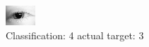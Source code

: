 \begin{figure}[h!]
\begin{center}
\includegraphics[width=0.60\columnwidth]{figures/ID70_class_4_target_3.png}
\end{center}
\caption{ Classification: 4 actual target: 3}
\label{fig:ID70_class_4_target_3}
\end{figure}
